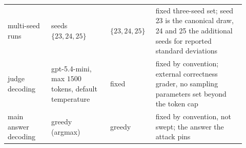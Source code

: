 \begin{tabular}{@{}p{0.17\linewidth} p{0.23\linewidth} p{0.17\linewidth} p{0.35\linewidth}@{}}
multi-seed runs & seeds $\{23,24,25\}$ & $\{23,24,25\}$ & fixed three-seed set; seed 23 is the canonical draw, 24 and 25 the additional seeds for reported standard deviations \\
judge decoding & gpt-5.4-mini, max $1500$ tokens, default temperature & fixed & fixed by convention; external correctness grader, no sampling parameters set beyond the token cap \\
main answer decoding & greedy (argmax) & greedy & fixed by convention, not swept; the answer the attack pins \\
\bottomrule
\end{tabular}
